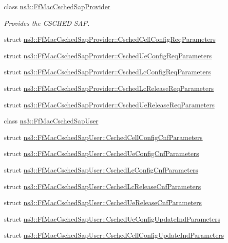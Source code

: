 \begin{DoxyCompactItemize}
\item 
class \hyperlink{classns3_1_1FfMacCschedSapProvider}{ns3\+::\+Ff\+Mac\+Csched\+Sap\+Provider}
\begin{DoxyCompactList}\small\item\em Provides the C\+S\+C\+H\+ED S\+AP. \end{DoxyCompactList}\item 
struct \hyperlink{structns3_1_1FfMacCschedSapProvider_1_1CschedCellConfigReqParameters}{ns3\+::\+Ff\+Mac\+Csched\+Sap\+Provider\+::\+Csched\+Cell\+Config\+Req\+Parameters}
\item 
struct \hyperlink{structns3_1_1FfMacCschedSapProvider_1_1CschedUeConfigReqParameters}{ns3\+::\+Ff\+Mac\+Csched\+Sap\+Provider\+::\+Csched\+Ue\+Config\+Req\+Parameters}
\item 
struct \hyperlink{structns3_1_1FfMacCschedSapProvider_1_1CschedLcConfigReqParameters}{ns3\+::\+Ff\+Mac\+Csched\+Sap\+Provider\+::\+Csched\+Lc\+Config\+Req\+Parameters}
\item 
struct \hyperlink{structns3_1_1FfMacCschedSapProvider_1_1CschedLcReleaseReqParameters}{ns3\+::\+Ff\+Mac\+Csched\+Sap\+Provider\+::\+Csched\+Lc\+Release\+Req\+Parameters}
\item 
struct \hyperlink{structns3_1_1FfMacCschedSapProvider_1_1CschedUeReleaseReqParameters}{ns3\+::\+Ff\+Mac\+Csched\+Sap\+Provider\+::\+Csched\+Ue\+Release\+Req\+Parameters}
\item 
class \hyperlink{classns3_1_1FfMacCschedSapUser}{ns3\+::\+Ff\+Mac\+Csched\+Sap\+User}
\item 
struct \hyperlink{structns3_1_1FfMacCschedSapUser_1_1CschedCellConfigCnfParameters}{ns3\+::\+Ff\+Mac\+Csched\+Sap\+User\+::\+Csched\+Cell\+Config\+Cnf\+Parameters}
\item 
struct \hyperlink{structns3_1_1FfMacCschedSapUser_1_1CschedUeConfigCnfParameters}{ns3\+::\+Ff\+Mac\+Csched\+Sap\+User\+::\+Csched\+Ue\+Config\+Cnf\+Parameters}
\item 
struct \hyperlink{structns3_1_1FfMacCschedSapUser_1_1CschedLcConfigCnfParameters}{ns3\+::\+Ff\+Mac\+Csched\+Sap\+User\+::\+Csched\+Lc\+Config\+Cnf\+Parameters}
\item 
struct \hyperlink{structns3_1_1FfMacCschedSapUser_1_1CschedLcReleaseCnfParameters}{ns3\+::\+Ff\+Mac\+Csched\+Sap\+User\+::\+Csched\+Lc\+Release\+Cnf\+Parameters}
\item 
struct \hyperlink{structns3_1_1FfMacCschedSapUser_1_1CschedUeReleaseCnfParameters}{ns3\+::\+Ff\+Mac\+Csched\+Sap\+User\+::\+Csched\+Ue\+Release\+Cnf\+Parameters}
\item 
struct \hyperlink{structns3_1_1FfMacCschedSapUser_1_1CschedUeConfigUpdateIndParameters}{ns3\+::\+Ff\+Mac\+Csched\+Sap\+User\+::\+Csched\+Ue\+Config\+Update\+Ind\+Parameters}
\item 
struct \hyperlink{structns3_1_1FfMacCschedSapUser_1_1CschedCellConfigUpdateIndParameters}{ns3\+::\+Ff\+Mac\+Csched\+Sap\+User\+::\+Csched\+Cell\+Config\+Update\+Ind\+Parameters}
\end{DoxyCompactItemize}
